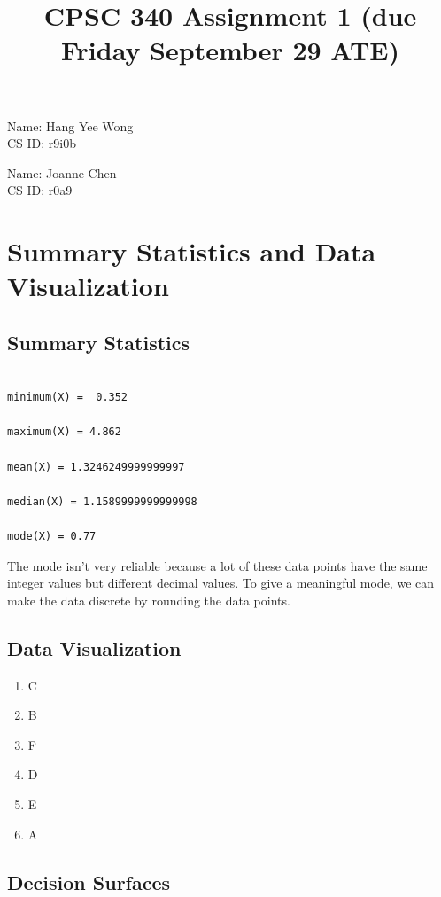 \documentclass{article}
\begin{document}
\title{CPSC 340 Assignment 1 (due Friday September 29 ATE)}
\author{}
\date{}
\maketitle
\vspace{-4em}


Name: Hang Yee Wong\\
CS ID: r9i0b

Name: Joanne Chen\\
CS ID: r0a9


\section{Summary Statistics and Data Visualization}

\subsection{Summary Statistics}

\begin{verbatim}

minimum(X) =  0.352

maximum(X) = 4.862

mean(X) = 1.3246249999999997

median(X) = 1.1589999999999998

mode(X) = 0.77

\end{verbatim}

The mode isn't very reliable because a lot of these data points have the same integer values but different decimal values. To give a meaningful mode, we can make the data discrete by rounding the data points.



\subsection{Data Visualization}

\begin{enumerate}
\item C
\item B
\item F
\item D
\item E
\item A
\end{enumerate}


\subsection{Decision Surfaces}
\end{document}
